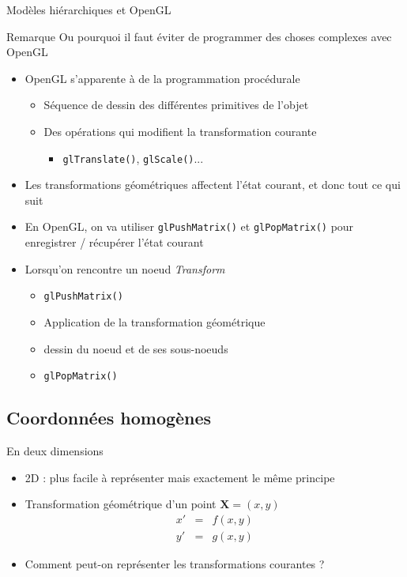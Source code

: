 \begin{frame}{Modèles hiérarchiques et OpenGL}
\begin{alertblock}{Remarque}
Ou pourquoi il faut éviter de programmer des choses complexes avec OpenGL
\end{alertblock}
\begin{itemize}
\item OpenGL s'apparente à de la programmation procédurale
\begin{itemize}
\item Séquence de dessin des différentes primitives de l'objet
\item Des opérations qui modifient la transformation courante
\begin{itemize}
\item \texttt{glTranslate()}, \texttt{glScale()}...
\end{itemize}
\end{itemize}
\item Les transformations géométriques affectent l'état courant, et donc tout ce qui suit
\item En OpenGL, on va utiliser \texttt{glPushMatrix()} et \texttt{glPopMatrix()} pour enregistrer / récupérer l'état courant
\item Lorsqu'on rencontre un noeud \textit{Transform}
\begin{itemize}
\item \texttt{glPushMatrix()}
\item Application de la transformation géométrique
\item dessin du noeud et de ses sous-noeuds
\item \texttt{glPopMatrix()}
\end{itemize}
\end{itemize}
\end{frame}


\subsection{Coordonnées homogènes}

\begin{frame}{En deux dimensions}
\begin{itemize}
\item 2D : plus facile à représenter mais exactement le même principe
\item Transformation géométrique d'un point $\mathbf{X}=(x,y)$
\begin{eqnarray*}
x' & = & f(x,y) \\
y' & = & g(x,y)
\end{eqnarray*}
\item Comment peut-on représenter les transformations courantes ?
\end{itemize}
\end{frame}


